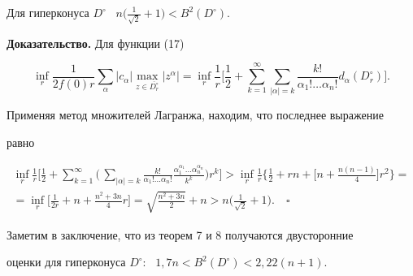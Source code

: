 \begin{thm}


Для гиперконуса $D^\circ$ \ $n\big(\frac1{\sqrt2}+1


\big)<B^2(D^\circ)$.


\end{thm}





{\bf Доказательство.} Для функции (17)


$$


\inf_r\frac1{2f(0)r}


\sum_\alpha|c_{\alpha}|\max_{z\in\overline{D_r^\circ}}|z^\alpha|=


\inf_r\frac1r\bigg


[\frac12+\sum_{k=1}^\infty


\sum_{|\alpha|=k}\frac{k!}{\alpha_1!\dotsc\alpha_n!}d_\alpha(D_r^\circ)


\bigg].


$$


Применяя метод множителей Лагранжа, находим, что последнее выражение


равно


\begin{multline*}


\inf_r\frac1r\bigg[\frac12+\sum_{k=1}^\infty


\bigg(\,\sum_{|\alpha|=k}\frac{k!}{\alpha_1!\dotsc\alpha_n!}


\frac{\alpha_1^{\alpha_1}\dotsc\alpha_n^{\alpha_n}}{k^k}\bigg)r^k


\bigg]>\inf_r\frac1r\bigg\{\frac12+rn+\bigg[n+\frac{n(n-1)}4\bigg]r^2


\bigg\}= \\


%


=\inf_r\bigg[\frac1{2r}+n+\frac{n^2+3n}4r\bigg]=


\sqrt{\frac{n^2+3n}{2}}+n>n\bigg(\frac{1}{\sqrt{2}}+1\bigg).\quad\square


\end{multline*}





Заметим в заключение, что из теорем 7 и 8 получаются двусторонние


оценки для гиперконуса $D^\circ$: \ $1,7n<B^2(D^\circ)<2,22(n+1)$.







